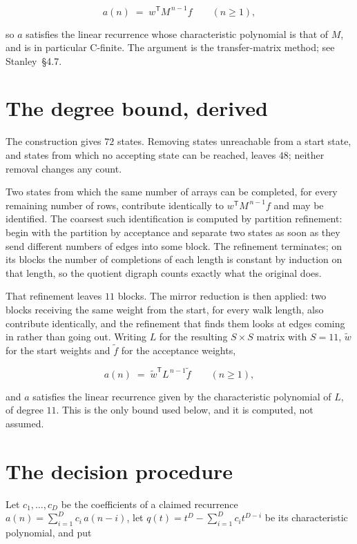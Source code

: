 \documentclass[11pt]{article}
\theoremstyle{definition}
\begin{document}
\[a(n) \;=\; w^{\mathsf T} M^{\,n-1} f \qquad (n \ge 1),\]

so $a$ satisfies the linear recurrence whose characteristic polynomial is that of $M$, and is in particular C-finite. The argument is the transfer-matrix method; see Stanley~\S4.7.

\section{The degree bound, derived}

The construction gives $72$ states. Removing states unreachable from a start state, and states from which no accepting state can be reached, leaves $48$; neither removal changes any count.

Two states from which the same number of arrays can be completed, for every remaining number of rows, contribute identically to $w^{\mathsf T}M^{\,n-1}f$ and may be identified. The coarsest such identification is computed by partition refinement: begin with the partition by acceptance and separate two states as soon as they send different numbers of edges into some block. The refinement terminates; on its blocks the number of completions of each length is constant by induction on that length, so the quotient digraph counts exactly what the original does.

That refinement leaves $11$ blocks. The mirror reduction is then applied: two blocks receiving the same weight from the start, for every walk length, also contribute identically, and the refinement that finds them looks at edges coming in rather than going out. Writing $L$ for the resulting $S \times S$ matrix with $S = 11$, $\tilde w$ for the start weights and $\tilde f$ for the acceptance weights,

\[a(n) \;=\; \tilde w^{\mathsf T} L^{\,n-1} \tilde f \qquad (n \ge 1),\]

and $a$ satisfies the linear recurrence given by the characteristic polynomial of $L$, of degree $11$. This is the only bound used below, and it is computed, not assumed.

\section{The decision procedure}

Let $c_1,\dots,c_D$ be the coefficients of a claimed recurrence $a(n) = \sum_{i=1}^{D} c_i\,a(n-i)$, let $q(t) = t^{D} - \sum_{i=1}^{D} c_i t^{D-i}$ be its characteristic polynomial, and put
\end{document}
